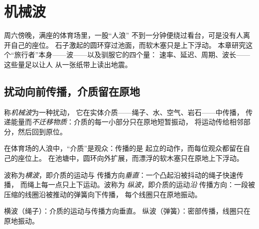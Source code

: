 \chapter{机械波}\label{ch:g12:mechanical-waves}

周六傍晚，满座的体育场里，一股“人浪”
不到一分钟便绕过看台，可是没有人离开自己的座位。
石子激起的圆环穿过池面，而软木塞只是上下浮动。
本章研究这个“旅行者”本身——波——以及驯服它的四个量：
速率、延迟、周期、波长——这些量足以让人
从一张纸带上读出地震。

\section{扰动向前传播，介质留在原地}

\begin{definition}[机械波]\label{def:g12:mechanical-waves:wave}
称\emph{机械波}为一种扰动，
它在实体介质——绳子、水、空气、岩石——中传播，
传递能量而\emph{不迁移物质}：介质的每一小部分只在原地短暂振动，
将运动传给相邻部分，然后回到原位。
\end{definition}

\begin{example}[物质不随波迁移]\label{ex:g12:mechanical-waves:transport}
在体育场的人浪中，“介质”是观众：传播的是
起立的动作，而每位观众都留在自己的座位上。
在池塘中，圆环向外扩展，而漂浮的软木塞只在原地上下浮动。
\end{example}

\begin{definition}[横波与纵波]\label{def:g12:mechanical-waves:transverse}
波称为\emph{横波}，即介质的运动与
传播方向\emph{垂直}：一个凸起沿被抖动的绳子快速传播，
而绳上每一点只上下运动。波称为
\emph{纵波}，即介质的运动\emph{沿}
传播方向：一段被压缩的线圈沿被推动的弹簧向下传播，
每个线圈只在原地振动。
\end{definition}

\begin{omfigure}

{\small 横波（绳子）：介质的运动与传播方向垂直。
纵波（弹簧）：密部传播，线圈只在原地振动。}
\end{omfigure}


